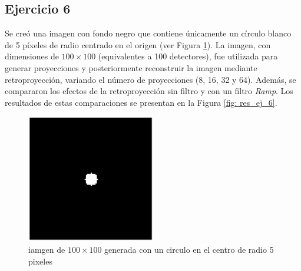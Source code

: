 \documentclass[11pt, twocolumn]{article}
\begin{document}
\subsection*{Ejercicio 6}
Se creó una imagen con fondo negro que contiene únicamente un círculo blanco de 5 píxeles de radio centrado en el origen (ver Figura \ref{fig:circle_ej_6}). La imagen, con dimensiones de $100\times100$ (equivalentes a 100 detectores), fue utilizada para generar proyecciones y posteriormente reconstruir la imagen mediante retroproyección, variando el número de proyecciones (8, 16, 32 y 64). Además, se compararon los efectos de la retroproyección sin filtro y con un filtro \textit{Ramp}. Los resultados de estas comparaciones se presentan en la Figura \ref{fig: res_ej_6}.

\begin{figure} [htbp]
    \centering
    \includegraphics*[width=0.5\textwidth]{./images/ej_6/circle.png}
    \caption{iamgen de $100\times100$ generada con un circulo en el centro de radio 5 pixeles}
    \label{fig:circle_ej_6}
\end{figure}
\end{document}
